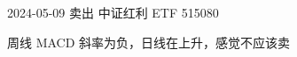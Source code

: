 \documentclass{article}
\begin{document}
2024-05-09 卖出 中证红利 ETF 515080

周线 MACD 斜率为负，日线在上升，感觉不应该卖
\end{document}

